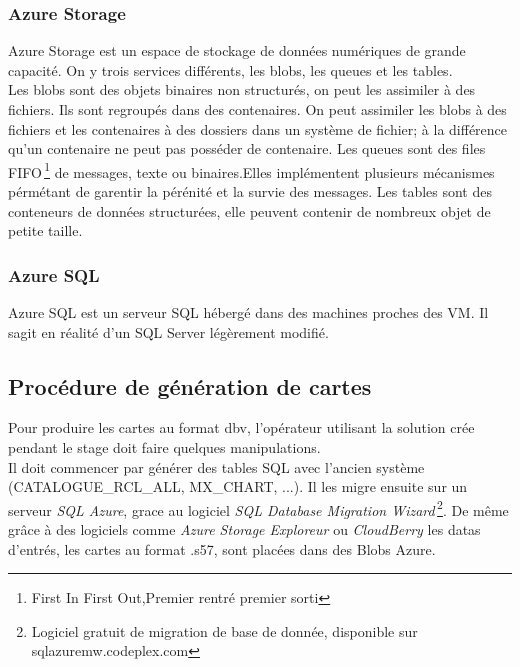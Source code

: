 \subsubsection{Azure Storage}
Azure Storage est un espace de stockage de données numériques de
grande capacité. On y trois services différents, les blobs, les queues et les tables.\\

Les blobs sont des objets binaires non structurés, on peut les
assimiler à des fichiers. Ils sont regroupés dans des contenaires. On
peut assimiler les blobs à des fichiers et les contenaires à des
dossiers dans un système de fichier; à la différence qu'un contenaire
ne peut pas posséder de contenaire. Les queues sont des files
FIFO\,\footnote{{First In First Out},Premier rentré premier sorti} de
messages, texte ou binaires.Elles implémentent plusieurs mécanismes
pérmétant de garentir la pérénité et la survie des messages. Les
tables sont des conteneurs de données structurées, elle peuvent
contenir de nombreux objet de petite taille.\\



\subsubsection{Azure SQL}
Azure SQL est un serveur SQL hébergé dans des machines proches des
VM. Il sagit en réalité d'un SQL Server légèrement modifié.\\



%
%

\subsection{Procédure de génération de cartes}

Pour produire les cartes au format dbv, l'opérateur utilisant la
solution crée pendant le stage doit faire quelques manipulations. \\

Il doit commencer par générer des tables SQL avec l'ancien système
(CATALOGUE\_RCL\_ALL, MX\_CHART, ...). Il les migre ensuite sur un
serveur \textit{SQL Azure}, grace au logiciel \textit{SQL Database
  Migration Wizard}\,\footnote{Logiciel gratuit de migration de base
  de donnée, disponible sur sqlazuremw.codeplex.com}. De même grâce à
des logiciels comme \textit{Azure Storage Exploreur} ou
\textit{CloudBerry} les datas d'entrés, les cartes au format .s57, sont
placées dans des Blobs Azure.\\

